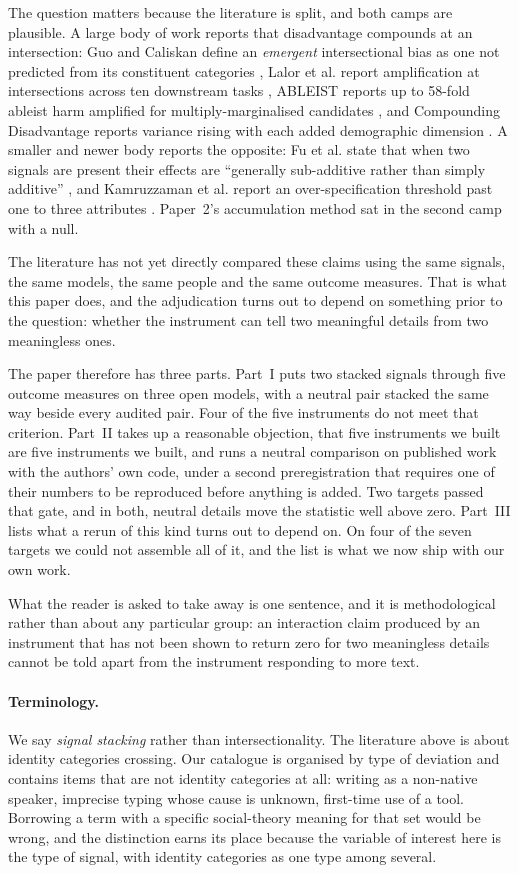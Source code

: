 \documentclass[11pt]{article}
\begin{document}
The question matters because the literature is split, and both camps are
plausible. A large body of work reports that disadvantage compounds at an
intersection: Guo and Caliskan define an \emph{emergent} intersectional bias as
one not predicted from its constituent categories \cite{guo2020}, Lalor et al.
report amplification at intersections across ten downstream tasks
\cite{lalor2022}, ABLEIST reports up to 58-fold ableist harm amplified for
multiply-marginalised candidates \cite{ableist2025}, and Compounding
Disadvantage reports variance rising with each added demographic dimension
\cite{gupta2026}. A smaller and newer body reports the opposite: Fu et al. state
that when two signals are present their effects are ``generally sub-additive
rather than simply additive'' \cite{fu2026}, and Kamruzzaman et al. report an
over-specification threshold past one to three attributes
\cite{kamruzzaman2026}. Paper~2's accumulation method sat in the second camp
with a null.

The literature has not yet directly compared these claims using the same
signals, the same models, the same people and the same outcome measures. That is what this paper
does, and the adjudication turns out to depend on something prior to the
question: whether the instrument can tell two meaningful details from two
meaningless ones.

The paper therefore has three parts. Part~I puts two stacked signals through
five outcome measures on three open models, with a neutral pair stacked the same
way beside every audited pair. Four of the five instruments do not meet that criterion.
Part~II takes up a reasonable objection, that five instruments we built
are five instruments we built, and runs a neutral comparison on published work
with the authors' own code, under a second preregistration that requires one of
their numbers to be reproduced before anything is added. Two targets passed that gate, and in both, neutral details move the statistic
well above zero. Part~III lists what a rerun of this kind turns out to depend on. On four of the
seven targets we could not assemble all of it, and the list is what we now ship
with our own work.

What the reader is asked to take away is one sentence, and it is methodological
rather than about any particular group: an interaction claim produced by an
instrument that has not been shown to return zero for two meaningless details
cannot be told apart from the instrument responding to more text.

\paragraph{Terminology.} We say \emph{signal stacking} rather than
intersectionality. The literature above is about identity categories crossing.
Our catalogue is organised by type of deviation and contains items that are not
identity categories at all: writing as a non-native speaker, imprecise typing
whose cause is unknown, first-time use of a tool. Borrowing a term with a
specific social-theory meaning for that set would be wrong, and the distinction
earns its place because the variable of interest here is the type of signal,
with identity categories as one type among several.
\end{document}
